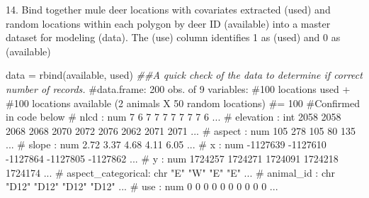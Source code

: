\documentclass[
  letterpaper,
]{book}
\newenvironment{Shaded}{\begin{snugshade}}{\end{snugshade}}
\newcommand{\AttributeTok}[1]{\textcolor[rgb]{0.40,0.45,0.13}{#1}}
\newcommand{\CommentTok}[1]{\textcolor[rgb]{0.37,0.37,0.37}{#1}}
\newcommand{\DecValTok}[1]{\textcolor[rgb]{0.68,0.00,0.00}{#1}}
\newcommand{\DocumentationTok}[1]{\textcolor[rgb]{0.37,0.37,0.37}{\textit{#1}}}
\newcommand{\FunctionTok}[1]{\textcolor[rgb]{0.28,0.35,0.67}{#1}}
\newcommand{\NormalTok}[1]{\textcolor[rgb]{0.00,0.23,0.31}{#1}}
\newcommand{\OtherTok}[1]{\textcolor[rgb]{0.00,0.23,0.31}{#1}}
\newcommand{\SpecialCharTok}[1]{\textcolor[rgb]{0.37,0.37,0.37}{#1}}
\newcommand{\StringTok}[1]{\textcolor[rgb]{0.13,0.47,0.30}{#1}}
\begin{document}
\begin{Shaded}
\end{Shaded}

14. Bind together mule deer locations with covariates extracted (used)
and random locations within each polygon by deer ID (available) into a
master dataset for modeling (data). The (use) column identifies 1 as
(used) and 0 as (available)

\begin{Shaded}
\begin{Highlighting}[]
\NormalTok{data }\OtherTok{=} \FunctionTok{rbind}\NormalTok{(available, used)}
\DocumentationTok{\#\#A quick check of the data to determine if correct number of records.}
\CommentTok{\#\textquotesingle{}\textquotesingle{}data.frame\textquotesingle{}: 200 obs. of  9 variables:}
\CommentTok{\#100 locations used +}
\CommentTok{\#100 locations available (2 animals X 50 random locations)}
\CommentTok{\#= 100 \#Confirmed in code below}
\CommentTok{\# nlcd              : num  7 6 7 7 7 7 7 7 7 6 ...}
\CommentTok{\# elevation         : int  2058 2058 2068 2068 2070 2072 2076 2062 2071 2071 ...}
\CommentTok{\# aspect            : num  105 278 105 80 135 ...}
\CommentTok{\# slope             : num  2.72 3.37 4.68 4.11 6.05 ...}
\CommentTok{\# x                 : num  {-}1127639 {-}1127610 {-}1127864 {-}1127805 {-}1127862 ...}
\CommentTok{\# y                 : num  1724257 1724271 1724091 1724218 1724174 ...}
\CommentTok{\# aspect\_categorical: chr  "E" "W" "E" "E" ...}
\CommentTok{\# animal\_id         : chr  "D12" "D12" "D12" "D12" ...}
\CommentTok{\# use               : num  0 0 0 0 0 0 0 0 0 0 ...}
\end{Highlighting}
\end{Shaded}
\end{document}
